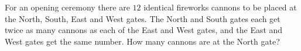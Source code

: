 For an opening ceremony there are $12$ identical fireworks cannons to be placed at the North, South, East and West gates. The North and South gates each get twice as many cannons as each of the East and West gates, and the East and West gates get the same number. How many cannons are at the North gate?
